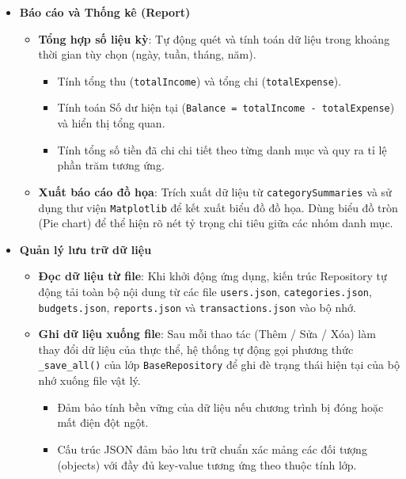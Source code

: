 \documentclass[12pt,letterpaper]{article}
\begin{document}
\begin{itemize}
\begin{itemize}
    \end{itemize}
    \item \textbf{Báo cáo và Thống kê (Report)}
    \begin{itemize}
        \item \textbf{Tổng hợp số liệu kỳ}: Tự động quét và tính toán dữ liệu trong khoảng thời gian tùy chọn (ngày, tuần, tháng, năm).
        \begin{itemize}
            \item Tính tổng thu (\texttt{totalIncome}) và tổng chi (\texttt{totalExpense}).
            \item Tính toán Số dư hiện tại (\texttt{Balance = totalIncome - totalExpense}) và hiển thị tổng quan.
            \item Tính tổng số tiền đã chi chi tiết theo từng danh mục và quy ra tỉ lệ phần trăm tương ứng.
        \end{itemize}
        \item \textbf{Xuất báo cáo đồ họa}: Trích xuất dữ liệu từ \texttt{categorySummaries} và sử dụng thư viện \texttt{Matplotlib} để kết xuất biểu đồ đồ họa. Dùng biểu đồ tròn (Pie chart) để thể hiện rõ nét tỷ trọng chi tiêu giữa các nhóm danh mục.
    \end{itemize}
    \item \textbf{Quản lý lưu trữ dữ liệu}
    \begin{itemize}
        \item \textbf{Đọc dữ liệu từ file}: Khi khởi động ứng dụng, kiến trúc Repository tự động tải toàn bộ nội dung từ các file \texttt{users.json}, \texttt{categories.json}, \texttt{budgets.json}, \texttt{reports.json} và \texttt{transactions.json} vào bộ nhớ.
        \item \textbf{Ghi dữ liệu xuống file}: Sau mỗi thao tác (Thêm / Sửa / Xóa) làm thay đổi dữ liệu của thực thể, hệ thống tự động gọi phương thức \texttt{\_save\_all()} của lớp \texttt{BaseRepository} để ghi đè trạng thái hiện tại của bộ nhớ xuống file vật lý.
        \begin{itemize}
            \item Đảm bảo tính bền vững của dữ liệu nếu chương trình bị đóng hoặc mất điện đột ngột.
            \item Cấu trúc JSON đảm bảo lưu trữ chuẩn xác mảng các đối tượng (objects) với đầy đủ key-value tương ứng theo thuộc tính lớp.
        \end{itemize}
    \end{itemize}
\end{itemize}
\end{document}
